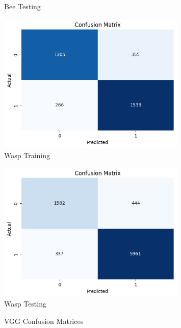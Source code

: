 \documentclass[12pt]{article}
\begin{document}
\begin{enumerate}
\begin{figure}[H]
\begin{minipage}{0.45\textwidth}
				Bee Testing
			\end{minipage}
			\newline
			\begin{minipage}{0.45\textwidth}
				\vspace{0.5 cm}
				\centering
				\includegraphics[width=0.8\textwidth]{Images/Confusion/vgg wasps train.png}\\ \vspace{0.25 cm}
				Wasp Training
			\end{minipage}
			\hfill
			\begin{minipage}{0.45\textwidth}
				\centering
				\includegraphics[width=0.8\textwidth]{Images/Confusion/vgg wasps test.png}\\ \vspace{0.25 cm}
				Wasp Testing
			\end{minipage}
			\vspace{0.5 cm}
			\caption{VGG Confusion Matrices}
		\end{figure}
		

\end{enumerate}
\end{document}
